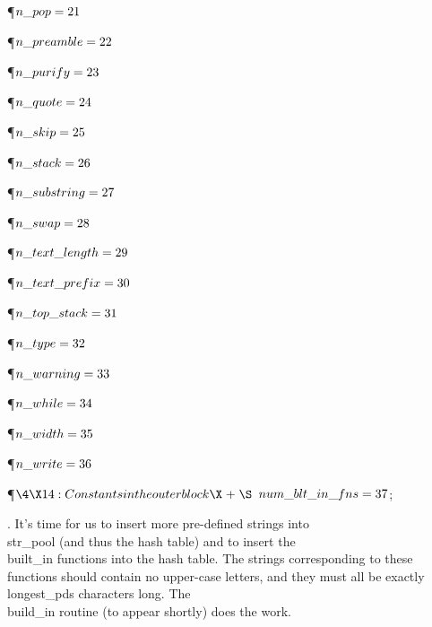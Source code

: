 \P\D {}$\\{n\_pop}=21$\par
\P\D {}$\\{n\_preamble}=22$\par
\P\D {}$\\{n\_purify}=23$\par
\P\D {}$\\{n\_quote}=24$\par
\P\D {}$\\{n\_skip}=25$\par
\P\D {}$\\{n\_stack}=26$\par
\P\D {}$\\{n\_substring}=27$\par
\P\D {}$\\{n\_swap}=28$\par
\P\D {}$\\{n\_text\_length}=29$\par
\P\D {}$\\{n\_text\_prefix}=30$\par
\P\D {}$\\{n\_top\_stack}=31$\par
\P\D {}$\\{n\_type}=32$\par
\P\D {}$\\{n\_warning}=33$\par
\P\D {}$\\{n\_while}=34$\par
\P\D {}$\\{n\_width}=35$\par
\P\D {}$\\{n\_write}=36$\par
\Y\P$\4\X14:Constants in the outer block\X\mathrel{+}\S$\6
$\\{num\_blt\_in\_fns}=37$;\par
\fi

.
It's time for us to insert more pre-defined strings into \\{str\_pool}
(and thus the hash table) and to insert the \\{built\_in} functions into
the hash table.  The strings corresponding to these functions should
contain no upper-case letters, and they must all be exactly
\\{longest\_pds} characters long.  The \\{build\_in} routine (to appear
shortly) does the work.

